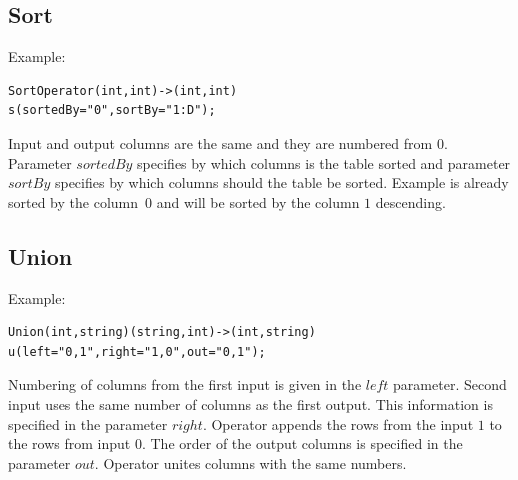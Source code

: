 \subsection{Sort}
Example:
\begin{lstlisting}
SortOperator(int,int)->(int,int)
s(sortedBy="0",sortBy="1:D");
\end{lstlisting}
Input and output columns are the same and they are numbered from $0$. Parameter $sortedBy$ specifies by which columns is the table sorted and parameter $sortBy$ specifies by which columns should the table be sorted. Example is already sorted by the column~$0$ and will be sorted by the column $1$ descending.


\subsection{Union}
Example:
\begin{lstlisting}
Union(int,string)(string,int)->(int,string)
u(left="0,1",right="1,0",out="0,1");
\end{lstlisting}
Numbering of columns from the first input is given in the $left$ parameter. Second input uses the same number of columns as the first output. This information is specified in the parameter $right$. Operator appends the rows from the input $1$ to the rows from input $0$. The order of the output columns is specified in the parameter $out$. Operator unites columns with the same numbers.

